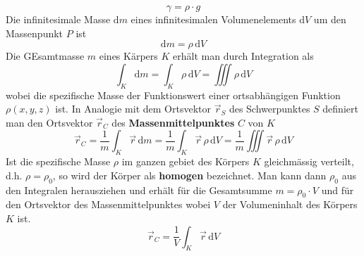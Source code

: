 \begin{equation}
\boxed{\gamma=\rho\cdot g}
\end{equation}
Die infinitesimale Masse $\text{d}m$ eines infinitesimalen Volumenelements $\text{d}V$ um den Massenpunkt $P$ ist
\begin{equation}
\boxed{\text{d}m=\rho\,\text{d}V}
\end{equation}
Die GEsamtmasse $m$ eines Kärpers $K$ erhält man durch Integration als
\begin{equation}
\boxed{\displaystyle \int_K\text{d}m=\displaystyle \int_K\rho\,\text{d}V=\displaystyle \iiint\rho\,\text{d}V}
\end{equation}
wobei die spezifische Masse der Funktionswert einer ortsabhängigen Funktion $\rho\left(x,y,z\right)$ ist. In Analogie mit dem Ortsvektor $\overrightarrow{r}_S$ des Schwerpunktes $S$ definiert man den Ortsvektor $\overrightarrow{r}_C$ des \textbf{Massenmittelpunktes} $C$ von $K$
\begin{equation}
\boxed{\overrightarrow{r}_C=\dfrac{1}{m}\displaystyle \int_K\overrightarrow{r}\,\text{d}m=\dfrac{1}{m}\displaystyle \int_K\overrightarrow{r}\,\rho\,\text{d}V=\dfrac{1}{m}\displaystyle \iiint\overrightarrow{r}\,\rho\,\text{d}V}
\end{equation}
Ist die spezifische Masse $\rho$ im ganzen gebiet des Körpers $K$ gleichmässig verteilt, d.h. $\rho=\rho_0$, so wird der Körper als \textbf{homogen} bezeichnet. Man kann dann $\rho_0$ aus den Integralen herausziehen und erhält für die Gesamtsumme $m=\rho_0\cdot V$ und für den Ortsvektor des Massenmittelpunktes wobei $V$ der Volumeninhalt des Körpers $K$ ist.
\begin{equation} 
\boxed{\overrightarrow{r}_C=\dfrac{1}{V}\displaystyle \int_K\overrightarrow{r}\,\text{d}V}
\end{equation} 